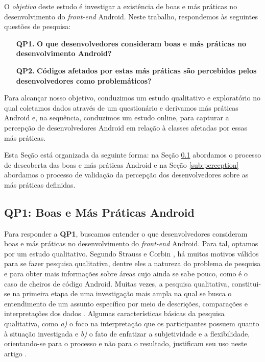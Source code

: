O \emph{objetivo} deste estudo é investigar a existência de boas e más práticas no desenvolvimento do \textit{front-end} Android. Neste trabalho, respondemos às seguintes questões de pesquisa:

\begin{itemize}
	\sloppy
	\item[\textbf{QP1.}] \textbf{O que desenvolvedores consideram boas e más práticas no desenvolvimento Android?}


	\item[\textbf{QP2.}] \textbf{Códigos afetados por estas más práticas são percebidos pelos desenvolvedores como problemáticos?}
\end{itemize}

Para alcançar nosso objetivo, conduzimos um estudo qualitativo e exploratório no qual coletamos dados através de um questionário e derivamos más práticas Android e, na sequência, conduzimos um estudo online, para capturar a percepção de desenvolvedores Android em relação à classes afetadas por essas más práticas. 

Esta Seção está organizada da seguinte forma: na Seção \ref{sub:smells} abordamos o processo de descoberta das boas e más práticas Android e na Seção \ref{sub:perception} abordamos o processo de validação da percepção dos desenvolvedores sobre as más práticas definidas. 

\subsection{QP1: Boas e Más Práticas Android}
\label{sub:smells}

Para responder a \textbf{QP1}, buscamos entender o que desenvolvedores consideram boas e más práticas no desenvolvimento do \textit{front-end} Android. Para tal, optamos por um estudo qualitativo.
Segundo Strauss e Corbin \cite{Strauss2007}, há muitos motivos válidos para se fazer pesquisa qualitativa, dentre eles a natureza do problema de pesquisa e para obter mais informações sobre áreas cujo ainda se sabe pouco, como é o caso de cheiros de código Android. Muitas vezes, a pesquisa qualitativa, constitui-se na primeira etapa de uma investigação mais ampla na qual se busca o entendimento de um assunto específico por meio de descrições, comparações e interpretações dos dados \cite{Prikladnicki, Prates2015}. Algumas características básicas da pesquisa qualitativa, como \textit{a)} o foco na interpretação que os participantes possuem quanto à situação investigada e \textit{b)} o fato de enfatizar a subjetividade e a flexibilidade, orientando-se para o processo e não para o resultado, justificam seu uso neste artigo \cite{Prates2015, King1994}.


